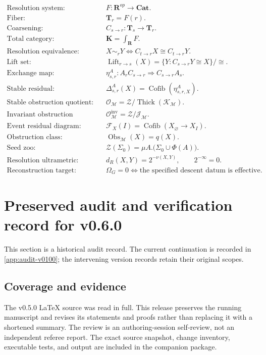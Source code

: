 \documentclass[11pt]{article}
\theoremstyle{definition}
\theoremstyle{remark}
\newcommand{\K}{\mathbf K}
\newcommand{\Rcat}{\mathbf R}
\newcommand{\Tcat}{\mathbf T}
\newcommand{\Cat}{\mathbf{Cat}}
\newcommand{\Lift}{\operatorname{Lift}}
\newcommand{\Cofib}{\operatorname{Cofib}}
\newcommand{\Obs}{\operatorname{Obs}}
\newcommand{\Zoo}{\mathcal Z}
\newcommand{\Seeds}{\Sigma}
\begin{document}
\begin{align*}
\text{Resolution system:}\quad
&F:\Rcat^{op}\to\Cat.\\[0.4em]
\text{Fiber:}\quad
&\Tcat_r=F(r).\\[0.4em]
\text{Coarsening:}\quad
&C_{s\to r}:\Tcat_s\to\Tcat_r.\\[0.4em]
\text{Total category:}\quad
&\K=\int_{\Rcat}F.\\[0.4em]
\text{Resolution equivalence:}\quad
&X\sim_rY\iff C_{t\to r}X\cong C_{t\to r}Y.\\[0.4em]
\text{Lift set:}\quad
&\Lift_{r\to s}(X)=\{Y:C_{s\to r}Y\cong X\}/\cong.\\[0.4em]
\text{Exchange map:}\quad
&\eta^A_{s,r}:A_rC_{s\to r}\Rightarrow C_{s\to r}A_s.\\[0.4em]
\text{Stable residual:}\quad
&\Delta^A_{s,r}(X)=\Cofib(\eta^A_{s,r,X}).\\[0.4em]
\text{Stable obstruction quotient:}\quad
&\mathcal O_{\mathscr M}=\mathcal Z/\operatorname{Thick}(\mathcal K_{\mathscr M}).\\[0.4em]
\text{Invariant obstruction quotient:}\quad
&\mathcal O^{\mathrm{inv}}_{\mathscr M}=\mathcal Z/\mathcal J_{\mathscr M}.\\[0.4em]
\text{Event residual diagram:}\quad
&\mathcal F_X(I)=\Cofib(X_{\varnothing}\to X_I).\\[0.4em]
\text{Obstruction class:}\quad
&\Obs_{\mathscr M}(X)=q(X).\\[0.4em]
\text{Seed zoo:}\quad
&\Zoo(\Seeds_0)=\mu A.\bigl(\Seeds_0\cup\Phi(A)\bigr).\\[0.4em]
\text{Resolution ultrametric:}\quad
&d_R(X,Y)=2^{-\nu(X,Y)},\qquad 2^{-\infty}=0.\\[0.4em]
\text{Reconstruction target:}\quad
&\Omega_G=0\iff\text{the specified descent datum is effective}.
\end{align*}


\section{Preserved audit and verification record for v0.6.0}\label{app:audit}

This section is a historical audit record. The current continuation is recorded in \cref{app:audit-v0100}; the intervening version records retain their original scopes.

\subsection{Coverage and evidence}
The v0.5.0 LaTeX source was read in full. This release preserves the running manuscript and revises its statements and proofs rather than replacing it with a shortened summary. The review is an authoring-session self-review, not an independent referee report. The exact source snapshot, change inventory, executable tests, and output are included in the companion package.
\end{document}
